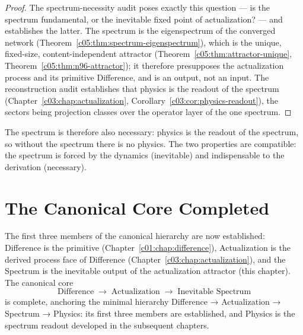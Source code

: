 \begin{proof}
The spectrum-necessity audit \cite{c05:QG295} poses exactly this question --- is the spectrum
fundamental, or the inevitable fixed point of actualization? --- and establishes the latter.
The spectrum is the eigenspectrum of the converged network
(Theorem~\ref{c05:thm:spectrum-eigenspectrum}), which is the unique, fixed-size,
content-independent attractor (Theorem~\ref{c05:thm:attractor-unique},
Theorem~\ref{c05:thm:n96-attractor}); it therefore presupposes the actualization process and
its primitive Difference, and is an output, not an input. The reconstruction audit
\cite{c05:QG296} establishes that physics is the readout of the spectrum
(Chapter~\ref{c03:chap:actualization}, Corollary~\ref{c03:cor:physics-readout}), the sectors
being projection classes over the operator layer of the one spectrum.
\end{proof}

The spectrum is therefore also necessary: physics is the readout of the spectrum, so without
the spectrum there is no physics. The two properties are compatible: the spectrum is forced
by the dynamics (inevitable) and indispensable to the derivation (necessary).

\section{The Canonical Core Completed}
\label{c05:sec:core-completed}

\begin{theorem}
\label{c05:thm:core-completed}
The first three members of the canonical hierarchy are now established: Difference is the
primitive (Chapter~\ref{c01:chap:difference}), Actualization is the derived process face of
Difference (Chapter~\ref{c03:chap:actualization}), and the Spectrum is the inevitable output of
the actualization attractor (this chapter). The canonical core
\begin{equation}
\label{c05:eq:core-complete}
\text{Difference}\;\longrightarrow\;\text{Actualization}\;\longrightarrow\;\text{Inevitable Spectrum}
\end{equation}
is complete, anchoring the minimal hierarchy Difference → Actualization → Spectrum → Physics:
its first three members are established, and Physics is the spectrum readout developed in
the subsequent chapters.
\end{theorem}

